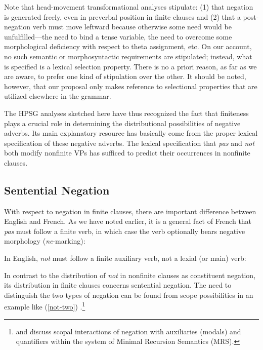 \documentclass[output=paper
                ,modfonts
                		,nonflat
	        ,collection
	        ,collectionchapter
	        ,collectiontoclongg
 	        ,biblatex
                ,babelshorthands
                ,newtxmath
                ,draftmode
                ,colorlinks, citecolor=brown
]{./langsci/langscibook}
\begin{document}
{\begin{exe}
\begin{xlist}
\begin{exe}
\begin{xlist}
Note that head-movement transformational analyses stipulate: (1) that negation
is generated freely, even in preverbal position in finite clauses and (2) that
a post-negation verb must move leftward because otherwise some need would be
unfulfilled---the need to bind a tense variable, the need to overcome some
morphological deficiency with respect to theta assignment, etc. On our
account, no such semantic or morphosyntactic requirements are stipulated;
instead, what is specified is a lexical selection property. There is no a
priori reason, as far as we are aware, to prefer one kind of stipulation over
the other. It should be noted, however, that our proposal only makes reference
to selectional properties that are utilized elsewhere in the grammar.
\fi


The HPSG analyses sketched here have thus recognized
the fact that finiteness plays a crucial role in
determining the distributional possibilities of negative
adverbs. Its main explanatory resource
has basically come from the proper lexical specification of these negative
adverbs. The lexical specification that \textit{pas} and
\textit{not} both modify nonfinite VPs has sufficed to predict their
occurrences in nonfinite clauses.



\subsection{Sentential Negation}

With respect to negation in finite clauses, there are important difference between English and French.
As we have noted earlier, it is a general fact of French that \textit{pas} must follow a finite verb, in which case the verb optionally bears negative morphology (\textit{ne}-marking):

\eal
{}
\zl
\noindent
In English, \textit{not} must follow a finite
auxiliary verb, not a lexial (or main) verb:

\eal
{}
\zl

In contrast to the distribution of \textit{not}
 in nonfinite clauses as constituent negation, its distribution
 in finite clauses concerns sentential
 negation.
  The need to distinguish the two types of negation can be found from scope
possibilities in an example like (\ref{not-two}) \citep[see]{Klima:64, Baker:89, Warner2000a-u}.\footnote{\citet{Warner2000a-u} and \citet{BL:13}
discuss scopal interactions of negation with auxiliaries (modals) and quantifiers
within the system of Minimal Recursion Semantics (MRS).}


\end{xlist}
\end{exe}
\end{xlist}
\end{exe}}
\end{document}
